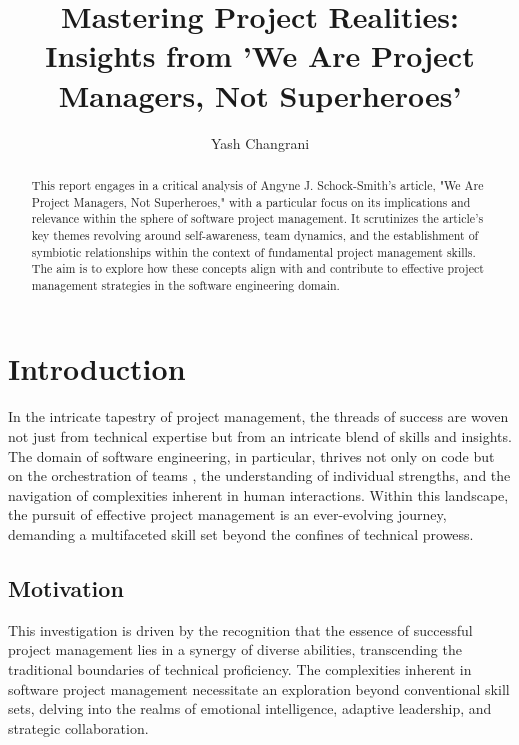 \documentclass[runningheads]{llncs}
\begin{document}
%
\title{Mastering Project Realities: Insights from 'We Are Project Managers, Not Superheroes'}
%
%
\author{Yash Changrani}
%
%
%
\maketitle              %
%
\begin{abstract}
This report engages in a critical analysis of Angyne J. Schock-Smith's article, "We Are Project Managers, Not Superheroes," with a particular focus on its implications and relevance within the sphere of software project management. It scrutinizes the article's key themes revolving around self-awareness, team dynamics, and the establishment of symbiotic relationships within the context of fundamental project management skills. The aim is to explore how these concepts align with and contribute to effective project management strategies in the software engineering domain.
\end{abstract}
%
%
%
\section{Introduction}

In the intricate tapestry of project management, the threads of success are woven not just from technical expertise but from an intricate blend of skills and insights. The domain of software engineering, in particular, thrives not only on code but on the orchestration of teams \cite{ref_8}, the understanding of individual strengths, and the navigation of complexities inherent in human interactions. Within this landscape, the pursuit of effective project management is an ever-evolving journey, demanding a multifaceted skill set beyond the confines of technical prowess.

\subsection{Motivation}
This investigation is driven by the recognition that the essence of successful project management lies in a synergy of diverse abilities, transcending the traditional boundaries of technical proficiency. The complexities inherent in software project management necessitate an exploration beyond conventional skill sets, delving into the realms of emotional intelligence, adaptive leadership, and strategic collaboration. \cite{ref_11}
\end{document}
